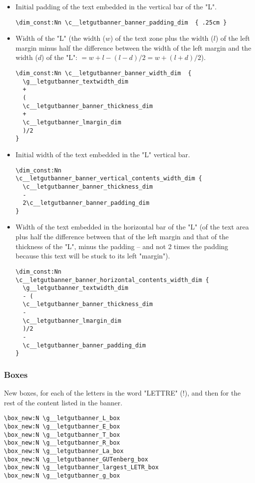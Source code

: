 \documentclass{letgut}
\begin{document}
\begin{itemize}
\begin{itemize}
\begin{lstlisting}
\dim_if_exist:NTF \c__letgut_banner_height_dim {
  \dim_const:NV \c__letgutbanner_banner_height_dim
    \c__letgut_banner_height_dim
}{
  \dim_const:Nn \c__letgutbanner_banner_height_dim  {
    \c__letgutbanner_textheight_dim
    +
    3cm
  }
}
\end{lstlisting}
\item Initial padding of the text embedded in the vertical bar of the "L".
\begin{lstlisting}
\dim_const:Nn \c__letgutbanner_banner_padding_dim  { .25cm }
\end{lstlisting}
\item Width of the "L" (the width (\(w\)) of the text zone plus the width (\(l\)) of
the left margin minus half the difference between the width of the left
margin and the width (\(d\)) of the "L": \(=w+l-(l-d)/2=w+(l+d)/2\)).
\begin{lstlisting}
\dim_const:Nn \c__letgutbanner_banner_width_dim  {
  \g__letgutbanner_textwidth_dim
  +
  (
  \c__letgutbanner_banner_thickness_dim
  +
  \c__letgutbanner_lmargin_dim
  )/2
}
\end{lstlisting}
\item Initial width of the text embedded in the "L" vertical bar.
\begin{lstlisting}
\dim_const:Nn
\c__letgutbanner_banner_vertical_contents_width_dim {
  \c__letgutbanner_banner_thickness_dim
  -
  2\c__letgutbanner_banner_padding_dim
}
\end{lstlisting}
\item Width of the text embedded in the horizontal bar of the "L" (of the text
area plus half the difference between that of the left margin and that of
the thickness of the "L", minus the padding -- and not 2 times the
padding because this text will be stuck to its left "margin").
\begin{lstlisting}
\dim_const:Nn
\c__letgutbanner_banner_horizontal_contents_width_dim {
  \g__letgutbanner_textwidth_dim
  - (
  \c__letgutbanner_banner_thickness_dim
  -
  \c__letgutbanner_lmargin_dim
  )/2
  -
  \c__letgutbanner_banner_padding_dim
}
\end{lstlisting}
\end{itemize}
\end{itemize}

\subsubsection{Boxes}
\label{ImplementationDeclarationsBoxes-s83hxqt0fck0}
New boxes, for each of the letters in the word "LETTRE" (!), and then for the
rest of the content listed in the banner.
\begin{lstlisting}
\box_new:N \g__letgutbanner_L_box
\box_new:N \g__letgutbanner_E_box
\box_new:N \g__letgutbanner_T_box
\box_new:N \g__letgutbanner_R_box
\box_new:N \g__letgutbanner_La_box
\box_new:N \g__letgutbanner_GUTenberg_box
\box_new:N \g__letgutbanner_largest_LETR_box
\box_new:N \g__letgutbanner_g_box
\end{lstlisting}
\end{document}
